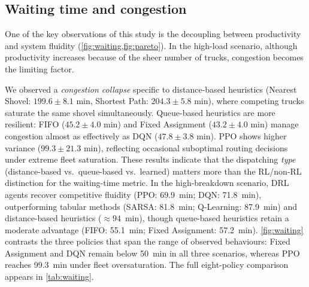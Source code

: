 \documentclass[11pt,a4paper]{article}
\begin{document}
\subsection{Waiting time and congestion}
\label{sec:waiting}

One of the key observations of this study is the decoupling between productivity and system fluidity (\cref{fig:waiting,fig:pareto}). In the high-load scenario, although productivity increases because of the sheer number of trucks, congestion becomes the limiting factor.

We observed a \textit{congestion collapse} specific to distance-based heuristics (Nearest Shovel: $199.6 \pm 8.1$ min, Shortest Path: $204.3 \pm 5.8$ min), where competing trucks saturate the same shovel simultaneously. Queue-based heuristics are more resilient: FIFO ($45.2 \pm 4.0$ min) and Fixed Assignment ($43.2 \pm 4.0$ min) manage congestion almost as effectively as DQN ($47.8 \pm 3.8$ min). PPO shows higher variance ($99.3 \pm 21.3$ min), reflecting occasional suboptimal routing decisions under extreme fleet saturation. These results indicate that the dispatching \emph{type} (distance-based vs.\ queue-based vs.\ learned) matters more than the RL/non-RL distinction for the waiting-time metric. In the high-breakdown scenario, DRL agents recover competitive fluidity (PPO: 69.9~min; DQN: 71.8~min), outperforming tabular methods (SARSA: 81.8~min; Q-Learning: 87.9~min) and distance-based heuristics ($\approx\!94$~min), though queue-based heuristics retain a moderate advantage (FIFO: 55.1~min; Fixed Assignment: 57.2~min). \cref{fig:waiting} contrasts the three policies that span the range of observed behaviours: Fixed Assignment and DQN remain below 50~min in all three scenarios, whereas PPO reaches 99.3~min under fleet oversaturation. The full eight-policy comparison appears in \cref{tab:waiting}.
\end{document}
